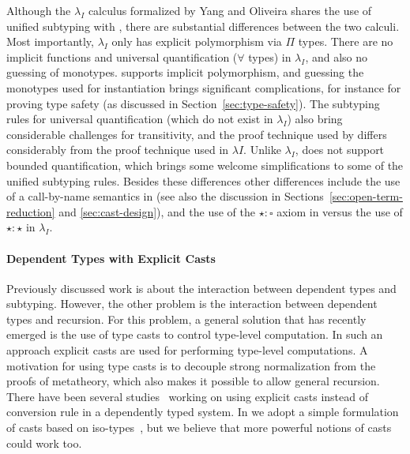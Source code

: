 Although the $\lambda_{I}$ calculus formalized by Yang and Oliveira shares the use
of unified subtyping with \name, there are substantial differences between the two calculi.
Most importantly, $\lambda_{I}$ only has explicit polymorphism via $\Pi$ types. There
are no implicit functions and universal quantification ($\forall$ types) in $\lambda_{I}$,
and also no guessing of monotypes. \name supports implicit polymorphism, and
guessing the monotypes used for instantiation brings significant complications, for instance
for proving type safety (as discussed in Section~\ref{sec:type-safety}).
The subtyping rules for universal quantification (which do not exist in $\lambda_{I}$) also
bring considerable challenges for transitivity, and the proof technique used by
\name differs considerably from the proof technique used in $\lambda{I}$.
Unlike $\lambda_{I}$, \name does not support bounded quantification, which brings
some welcome simplifications to some of the unified subtyping rules.
Besides these differences other differences include the use of a call-by-name
semantics in \name (see also the discussion in Sections~\ref{sec:open-term-reduction} and \ref{sec:cast-design}),
and the use of the $\star : \square$ axiom in \name versus the use of $\star : \star$
in $\lambda_{I}$.

\paragraph{Dependent Types with Explicit Casts} Previously
discussed work is about the interaction between dependent types and
subtyping. However, the other problem is the
interaction between dependent types and recursion. For this
problem, a general solution that has recently emerged is the use
of type casts to control type-level computation. In such an approach explicit casts
are used for performing type-level computations. A motivation for
using type casts is to decouple strong normalization from the
proofs of metatheory, which also makes it possible to allow general
recursion. There have been several studies~\cite{guru,sjoberg:msfp12,
  kimmel:plpv, zombie:popl15, fc:kind, Doorn:2013hq,isotype} working
on using explicit casts instead of conversion rule in a dependently
typed system. In \name we adopt a simple formulation of casts based
on iso-types~\cite{isotype}, but we believe that more powerful notions
of casts could work too.
